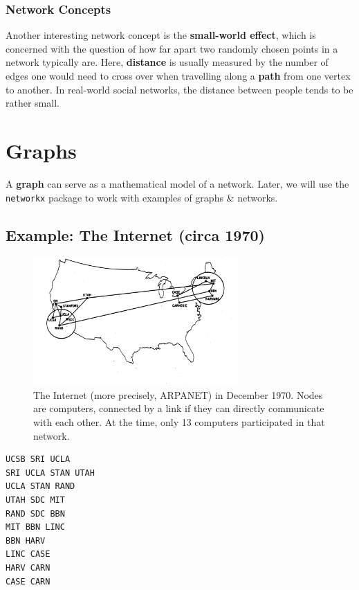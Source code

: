 \documentclass[a4paper,11pt]{article}
\newenvironment{code}{\captionsetup{type=listing}}{}
\begin{document}
\subsubsection{Network Concepts}
Another interesting network concept is the \textbf{small-world effect}, which is concerned with the question of how far apart two randomly chosen points in a network typically are.
Here, \textbf{distance} is usually measured by the number of edges one would need to cross over when travelling along a \textbf{path} from one vertex to another.
In real-world social networks, the distance between people tends to be rather small.

\section{Graphs}
A \textbf{graph} can serve as a mathematical model of a network.
Later, we will use the \texttt{networkx} package to work with examples of graphs \& networks.

\subsection{Example: The Internet (circa 1970)}
\begin{figure}[H]
    \centering
    \includegraphics[width=0.7\textwidth]{./images/f7dec1970.jpg}
    \caption{
        The Internet (more precisely, ARPANET) in December 1970.
        Nodes are computers, connected by a link if they can directly communicate with each other.
        At the time, only 13 computers participated in that network.
    }
\end{figure}

\begin{code}
\begin{verbatim}
UCSB SRI UCLA
SRI UCLA STAN UTAH
UCLA STAN RAND
UTAH SDC MIT
RAND SDC BBN
MIT BBN LINC
BBN HARV
LINC CASE
HARV CARN
CASE CARN
\end{verbatim}
\caption{\texttt{arpa.adj}}
\end{code}
\end{document}
